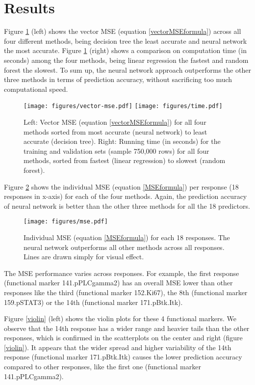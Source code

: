 \documentclass[graybox]{svmult}
\begin{document}
\section{Results}

Figure \ref{vectorMSE} (left) shows the vector MSE (equation
\ref{vectorMSEformula}) across all four different methods, being
decision tree the least accurate and neural network the most
accurate. Figure \ref{vectorMSE} (right) shows a comparison on
computation time (in seconds) among the four methods, being linear
regression the fastest and random forest the slowest. To sum up, the
neural network approach outperforms the other three methods in terms
of prediction accuracy, without sacrificing too much computational
speed.


\begin{figure}
\centering
\texttt{[image: figures/vector-mse.pdf]}
\texttt{[image: figures/time.pdf]}
\caption{Left: Vector MSE (equation \ref{vectorMSEformula}) for all
  four methods sorted from most accurate (neural network) to least
  accurate (decision tree). Right: Running time (in seconds) for the
  training and validation sets (sample 750,000 rows) for all four
  methods, sorted from fastest (linear regression) to slowest (random
  forest).}
\label{vectorMSE}
\end{figure}


Figure \ref{MSE} shows the individual MSE (equation \ref{MSEformula})
per response (18 responses in x-axis) for each of the four
methods. Again, the prediction accuracy of neural network is better
than the other three methods for all the 18 predictors.

\begin{figure}
\centering
\texttt{[image: figures/mse.pdf]}
\caption{Individual MSE (equation \ref{MSEformula}) for each 18
  responses. The neural network outperforms all other methods across
  all responses.  Lines are drawn simply for visual effect.}
\label{MSE}
\end{figure}

The MSE performance varies across responses. For example, the first response (functional marker 141.pPLCgamma2) has an overall MSE lower than other responses like the third (functional marker 152.Ki67), the 8th (functional marker 159.pSTAT3) or the 14th (functional marker 171.pBtk.Itk).

Figure \ref{violin} (left) shows the violin plots for these 4 functional markers. We observe that the 14th response has a wider range and heavier tails than the other responses, which is confirmed in the scatterplots on the center and right (figure \ref{violin}). It appears that the wider spread and higher variability of the 14th response (functional marker 171.pBtk.Itk) causes the lower prediction accuracy compared to other responses, like the first one (functional marker 141.pPLCgamma2).
\end{document}
